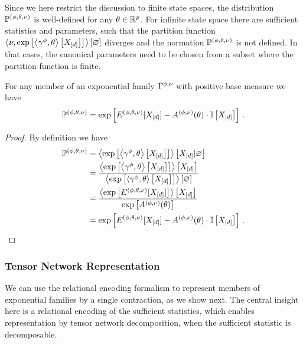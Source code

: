 Since we here restrict the discussion to finite state spaces, the distribution $\mathbb{P}^{(\phi,\theta,\nu)}$ is well-defined for any $\theta\in\mathbb{R}^{p}$.
For infinite state space there are sufficient statistics and parameters, such that the partition function $\left\langle \nu,\mathrm{exp}\left[\left\langle \gamma^{\phi},\theta\right\rangle \left[ X_{[d]} \right]\right]\right\rangle \left[ \varnothing \right]$ diverges and the normation $\mathbb{P}^{(\phi,\theta,\nu)}$ is not defined.
In that cases, the canonical parameters need to be chosen from a subset where the partition function is finite. 

\begin{lemma}\label{lem:energyCumulantRepresentation}
	For any member of an exponential family $\Gamma^{\phi,\nu}$ with positive base measure we have
		\[ \mathbb{P}^{(\phi,\theta,\nu)} = \mathrm{exp}\left[ E^{(\phi,\theta,\nu)}[X_{[d]}] - A^{(\phi,\nu)}(\theta)\cdot \mathbb{I}\left[X_{[d]}\right]\right] \, . \]
\end{lemma}
\begin{proof}
	By definition we have
	\begin{align*}
		\mathbb{P}^{(\phi,\theta,\nu)} 
		&= \left\langle 
		\mathrm{exp}\left[\left\langle \gamma^{\phi},\theta\right\rangle \left[ X_{[d]} \right]\right]
		\right\rangle \left[ X_{[d]} | \varnothing \right] \\
		&= \frac{\left\langle \mathrm{exp}\left[\left\langle \gamma^{\phi},\theta\right\rangle \left[ X_{[d]} \right]\right]\right\rangle \left[ X_{[d]} \right]
			}{\left\langle \mathrm{exp}\left[\left\langle \gamma^{\phi},\theta	\right\rangle \left[ X_{[d]} \right]\right]\right\rangle \left[ \varnothing \right]} \\
		&=  \frac{
		\left\langle \mathrm{exp}\left[E^{(\phi,\theta,\nu)}[X_{[d]}]\right]\right\rangle \left[ X_{[d]} \right]
		}{
		\mathrm{exp}\left[A^{(\phi,\nu)}(\theta)\right]
		} \\
		& = \mathrm{exp}\left[ E^{(\phi,\theta,\nu)}[X_{[d]}] - A^{(\phi,\nu)}(\theta)\cdot \mathbb{I}\left[X_{[d]}\right]\right] \, . 
	\end{align*}
\end{proof}


\subsubsection{Tensor Network Representation} 

We can use the relational encoding formalism to represent members of exponential families by a single contraction, as we show next.
The central insight here is a relational encoding of the sufficient statistics, which enables representation by tensor network decomposition, when the sufficient statistic is decomposable.

